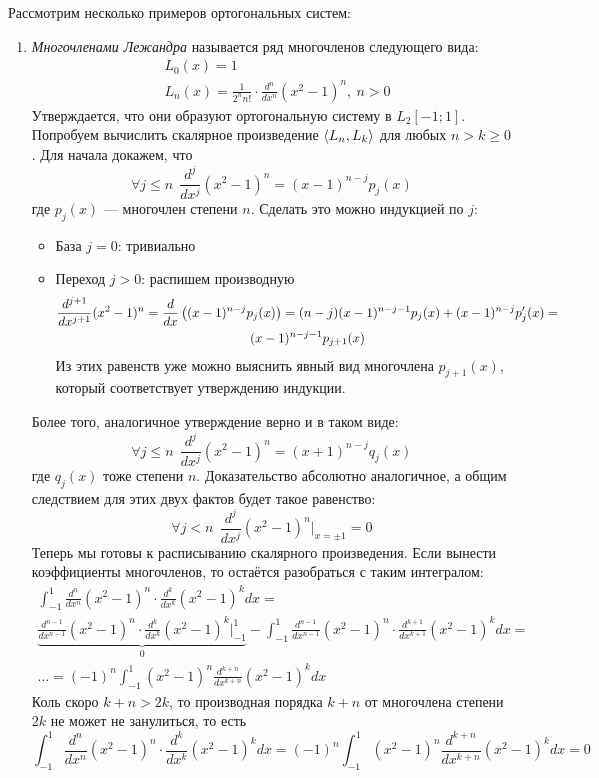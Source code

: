 \begin{example}
	Рассмотрим несколько примеров ортогональных систем:
	\begin{enumerate}
		\item \textit{Многочленами Лежандра} называется ряд многочленов следующего вида:
		\begin{align*}
			&{L_0(x) = 1}
			\\
			&{L_n(x) = \frac{1}{2^n n!} \cdot \frac{d^n}{dx^n} (x^2 - 1)^n,\ n > 0}
		\end{align*}
		Утверждается, что они образуют ортогональную систему в $L_2[-1; 1]$. Попробуем вычислить скалярное произведение $\left\langle L_n, L_k\right\rangle$ для любых $n > k \ge 0$. Для начала докажем, что
		\[
			\forall j \le n\ \ \frac{d^j}{dx^j}(x^2 - 1)^n = (x - 1)^{n - j} p_j(x)
		\]
		где $p_j(x)$ --- многочлен степени $n$. Сделать это можно индукцией по $j$:
		\begin{itemize}
			\item База $j = 0$: тривиально
			
			\item Переход $j > 0$: распишем производную
			\begin{multline*}
				\frac{d^{j + 1}}{dx^{j + 1}}(x^2 - 1)^n = \frac{d}{dx}\left((x - 1)^{n - j}p_j(x)\right) = (n - j)(x - 1)^{n - j - 1}p_j(x) + (x - 1)^{n - j}p'_j(x) =
				\\
				(x - 1)^{n - j - 1}p_{j + 1}(x)
			\end{multline*}
			Из этих равенств уже можно выяснить явный вид многочлена $p_{j + 1}(x)$, который соответствует утверждению индукции.
		\end{itemize}
		Более того, аналогичное утверждение верно и в таком виде:
		\[
			\forall j \le n\ \ \frac{d^j}{dx^j}(x^2 - 1)^n = (x + 1)^{n - j}q_j(x)
		\]
		где $q_j(x)$ тоже степени $n$. Доказательство абсолютно аналогичное, а общим следствием для этих двух фактов будет такое равенство:
		\[
			\forall j < n\ \ \frac{d^j}{dx^j}(x^2 - 1)^n\Big|_{x = \pm 1} = 0
		\]
		Теперь мы готовы к расписыванию скалярного произведения. Если вынести коэффициенты многочленов, то остаётся разобраться с таким интегралом:
		\begin{multline*}
			\int_{-1}^1 \frac{d^n}{dx^n}(x^2 - 1)^n \cdot \frac{d^k}{dx^k}(x^2 - 1)^kdx =
			\\
			\underbrace{\frac{d^{n - 1}}{dx^{n - 1}}(x^2 - 1)^n \cdot \frac{d^k}{dx^k}(x^2 - 1)^k\Big|_{-1}^1}_0 - \int_{-1}^1 \frac{d^{n - 1}}{dx^{n - 1}}(x^2 - 1)^n \cdot \frac{d^{k + 1}}{dx^{k + 1}}(x^2 - 1)^kdx =
			\\
			\ldots = (-1)^n \int_{-1}^1 (x^2 - 1)^n \frac{d^{k + n}}{dx^{k + n}}(x^2 - 1)^kdx
		\end{multline*}
		Коль скоро $k + n > 2k$, то производная порядка $k + n$ от многочлена степени $2k$ не может не занулиться, то есть
		\[
			\int_{-1}^1 \frac{d^n}{dx^n}(x^2 - 1)^n \cdot \frac{d^k}{dx^k}(x^2 - 1)^kdx = (-1)^n \int_{-1}^1 (x^2 - 1)^n \frac{d^{k + n}}{dx^{k + n}}(x^2 - 1)^kdx = 0
		\]
		

\end{enumerate}
\end{example}
